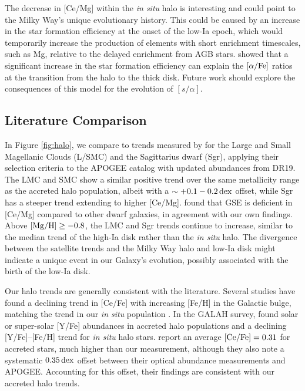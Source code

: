 \documentclass[twocolumn,twocolappendix]{aastex701}
\newcommand{\bracket}[2][H]{{\rm [#2/#1]}}
\newcommand{\dex}{\,{\rm dex}}
\begin{document}
The decrease in [Ce/Mg] within the {\it in situ} halo is interesting and could point to the Milky Way's unique evolutionary history. This could be caused by an increase in the star formation efficiency at the onset of the low-Ia epoch, which would temporarily increase the production of elements with short enrichment timescales, such as Mg, relative to the delayed enrichment from AGB stars. \citet{conroy_birth_2022} showed that a significant increase in the star formation efficiency can explain the $\bracket[Fe]{\alpha}$ ratios at the transition from the halo to the thick disk. Future work should explore the consequences of this model for the evolution of $[s/\alpha]$.

\subsection{Literature Comparison}

In Figure \ref{fig:halo}, we compare to trends measured by \citet{hasselquist_apogee_2021} for the Large and Small Magellanic Clouds (L/SMC) and the Sagittarius dwarf (Sgr), applying their selection criteria to the APOGEE catalog with updated abundances from DR19. The LMC and SMC show a similar positive trend over the same metallicity range as the accreted halo population, albeit with a $\sim+0.1-0.2\dex$ offset, while Sgr has a steeper trend extending to higher [Ce/Mg]. \citet{hasselquist_apogee_2021} found that GSE is deficient in [Ce/Mg] compared to other dwarf galaxies, in agreement with our own findings. Above $\bracket{Mg}\ge-0.8$, the LMC and Sgr trends continue to increase, similar to the median trend of the high-Ia disk rather than the {\it in situ} halo. The divergence between the satellite trends and the Milky Way halo and low-Ia disk might indicate a unique event in our Galaxy's evolution, possibly associated with the birth of the low-Ia disk.

Our halo trends are generally consistent with the literature. Several studies have found a declining trend in [Ce/Fe] with increasing [Fe/H] in the Galactic bulge, matching the trend in our {\it in situ} population \citep{razera_abundance_2022,sales-silva_perspective_2024,ernandes_abundances_2026}. In the GALAH survey, \citet{myeong_milky_2022} found solar or super-solar [Y/Fe] abundances in accreted halo populations and a declining [Y/Fe]--[Fe/H] trend for {\it in situ} halo stars. \citet{carrillo_detailed_2022} report an average $\bracket[Fe]{Ce}=0.31$ for accreted stars, much higher than our measurement, although they also note a systematic $0.35\dex$ offset between their optical abundance measurements and APOGEE. Accounting for this offset, their findings are consistent with our accreted halo trends.
\end{document}

